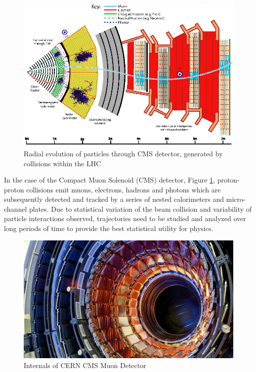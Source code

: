 \begin{figure}
    \centering
    \includegraphics{figs/cms_detector.jpg}
    \caption{Radial evolution of particles through CMS detector, generated by collisions within the LHC}
    \label{fig:cms}
\end{figure}

In the case of the Compact Muon Solenoid (CMS) detector, Figure \ref{fig:cms}, proton-proton collisions emit muons, electrons, hadrons and photons which are subsequently detected and tracked by a series of nested calorimeters and micro-channel plates. Due to statistical variation of the beam collision and variability of particle interactions observed, trajectories need to be studied and analyzed over long periods of time to provide the best statistical utility for physics.

\begin{figure}
    \centering
    \includegraphics{figs/sn-LHC.jpg}
    \caption{Internals of CERN CMS Muon Detector}
    \label{fig:cms_internals}
\end{figure}

